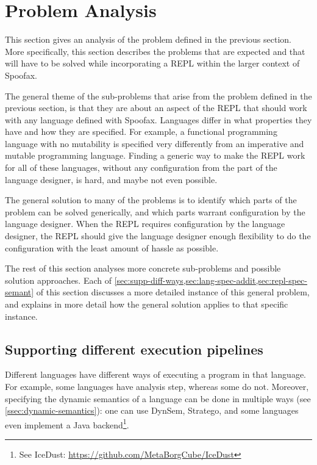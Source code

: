 \section{Problem Analysis}
\label{sec:problem-analysis}
This section gives an analysis of the problem defined in the previous
section. More specifically, this section describes the problems that
are expected and that will have to be solved while incorporating a
REPL within the larger context of Spoofax.

The general theme of the sub-problems that arise from the problem
defined in the previous section, is that they are about an aspect of
the REPL that should work with any language defined with
Spoofax. Languages differ in what properties they have and how they
are specified. For example, a functional programming language with no
mutability is specified very differently from an imperative and
mutable programming language. Finding a generic way to make the REPL
work for all of these languages, without any configuration from the
part of the language designer, is hard, and maybe not even
possible.

The general solution to many of the problems is to identify which
parts of the problem can be solved generically, and which parts
warrant configuration by the language designer. When the REPL requires
configuration by the language designer, the REPL should give the
language designer enough flexibility to do the configuration with the
least amount of hassle as possible.

The rest of this section analyses more concrete sub-problems and
possible solution approaches. Each of
\cref{sec:supp-diff-ways,sec:lang-spec-addit,sec:repl-spec-semant} of
this section discusses a more detailed instance of this general
problem, and explains in more detail how the general solution applies
to that specific instance.


\subsection{Supporting different execution pipelines}
\label{sec:supp-diff-ways}
Different languages have different ways of executing a program in that
language. For example, some languages have analysis step, whereas some
do not. Moreover, specifying the dynamic semantics of a language can
be done in multiple ways (see \cref{ssec:dynamic-semantics}): one can
use DynSem, Stratego, and some languages even implement a Java
backend\footnote{See IceDust:
  \url{https://github.com/MetaBorgCube/IceDust}}.%


